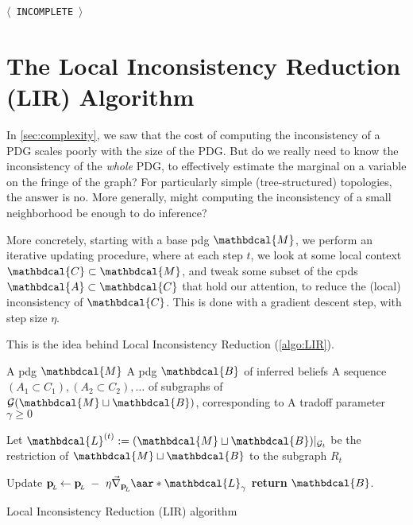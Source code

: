 \documentclass{article}
\theoremstyle{plain}
\theoremstyle{definition}
\theoremstyle{remark}
\newcommand{\TODO}[1][INCOMPLETE]{{\centering\Large\color{red}$\langle$~\texttt{#1}~$\rangle$\par}}
\newcommand\mat[1]{\mathbf{#1}}
\newcommand{\grad}{\vec\nabla}
\newcommand{\bp}[1][L]{\mat{p}_{\!_{#1}\!}}
\newcommand{\Ed}{\mathcal E}
\newcommand{\dg}[1]{\mathbdcal{#1}}
\newcommand{\bundle}{\mathbin{\sqcup}}
\newcommand{\Gr}{\mathcal G}
\begin{document}
\TODO

\section{The Local Inconsistency Reduction (LIR) Algorithm}
% 

In \cref{sec:complexity}, we saw that the cost of computing the inconsistency of a PDG scales poorly with the size of the PDG.
But do we really need to know the inconsistency of the \emph{whole} PDG, to effectively estimate the marginal on a variable on the fringe of the graph? For particularly simple (tree-structured) topologies, the answer is no. More generally, might computing the inconsistency of a small neighborhood be enough to do inference?

More concretely, starting with a base pdg $\dg M$, we perform an iterative updating procedure, where at each step $t$, we look at some local context $\dg C \subset \dg M$, and tweak some subset of the cpds $\dg A \subset \dg C$ that hold our attention, to reduce the (local) inconsistency of $\dg C$. This is done with a gradient descent step, with step size $\eta$.


 This is the idea behind Local Inconsistency Reduction (\cref{algo:LIR}).

\begin{algorithm}
	\begin{algorithmic}
		\Require A pdg $\dg M$
		\Require A pdg $\dg B$ of inferred beliefs
		\Require A sequence $(A_1 \subset C_1), (A_2 \subset C_2), \ldots $ of subgraphs of $\Gr({\dg M \bundle \dg B})$, corresponding to
		\Require A tradoff parameter $\gamma \ge 0$

		\Statex

		\Procedure{LIR}{$\dg M, \dg B, \mathcal R, \gamma$}
			\State Let $\dg L^{(t)} := (\dg M \bundle \dg B) |_{\Gr_t}$ be the restriction of $\dg M \bundle \dg B$ to the subgraph $R_t$
			\ForAll{edges $L \in \Ed^{\dg B |_{R_t}}$}

			 	\State Update $\bp[L] \gets \bp[L] ~ - ~\eta\grad_{\bp[L]} \aar*{\dg L}_\gamma$
			\EndFor
		\EndFor
		\State \textbf{return} $\dg B$.
		\EndProcedure
	\end{algorithmic}
	\caption{Local Inconsistency Reduction (LIR) algorithm}
	\label{algo:LIR}
\end{algorithm}
\end{document}
